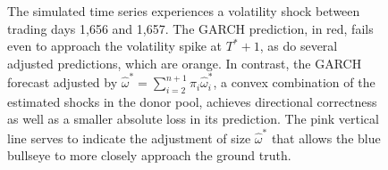 \documentclass[11pt,3p,review,authoryear]{elsarticle}
\theoremstyle{definition}
\begin{document}
  \begin{figure}[h!]
    \begin{center}
      \caption{The simulated time series experiences a volatility shock between trading days 1,656 and 1,657.  The GARCH prediction, in red, fails even to approach the volatility spike at $T^{*}+1$, as do several adjusted predictions, which are orange.  In contrast, the GARCH forecast adjusted by $\hat\omega^{*} = \sum^{n+1}_{i=2}\pi_{i}\hat\omega^{*}_{i} $, a convex combination of the estimated shocks in the donor pool, achieves directional correctness as well as a smaller absolute loss in its prediction.  The pink vertical line serves to indicate the adjustment of size $\hat\omega^{*}$ that allows the blue bullseye to more closely approach the ground truth.}    \label{fig:motivating_piece_convex_combination}
   
      \end{center}
    \end{figure}
\end{document}
